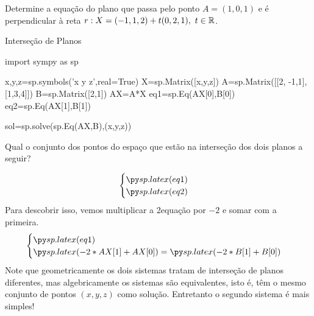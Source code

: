 \begin{frame}
\begin{exe}
Determine a equação do plano que passa pelo ponto $A=(1,0,1)$ e é perpendicular à reta
$r: X=(-1,1,2)+t(0,2,1),\ t\in \mathbb{R}$.
\end{exe}

\end{frame}

\begin{frame}[label=sistemas,fragile=singleslide]{Interseção de Planos}

\begin{pycode}
import sympy as sp

x,y,z=sp.symbols('x y z',real=True)
X=sp.Matrix([x,y,z])
A=sp.Matrix([[2, -1,1],[1,3,4]])
B=sp.Matrix([2,1])
AX=A*X
eq1=sp.Eq(AX[0],B[0])
eq2=sp.Eq(AX[1],B[1])

sol=sp.solve(sp.Eq(AX,B),(x,y,z))

\end{pycode}


Qual o conjunto dos pontos do espaço que estão na interseção dos dois planos a seguir?

\[\begin{cases}
\pyl{eq1}\\
\pyl{eq2}
\end{cases}\]
Para descobrir isso, vemos multiplicar a 2\fm equação por $-2$ e somar com a primeira.
\[\begin{cases}
\pyl{eq1}\\
\pyl{-2*AX[1]+AX[0]}=\pyl{-2*B[1]+B[0]}
\end{cases}\]
Note que geometricamente os dois sistemas tratam de interseção de planos diferentes, mas algebricamente os sistemas são {\color{blue} equivalentes}, isto é, têm o mesmo conjunto de pontos $(x,y,z)$ como solução. Entretanto o segundo sistema é mais simples!
\end{frame}


